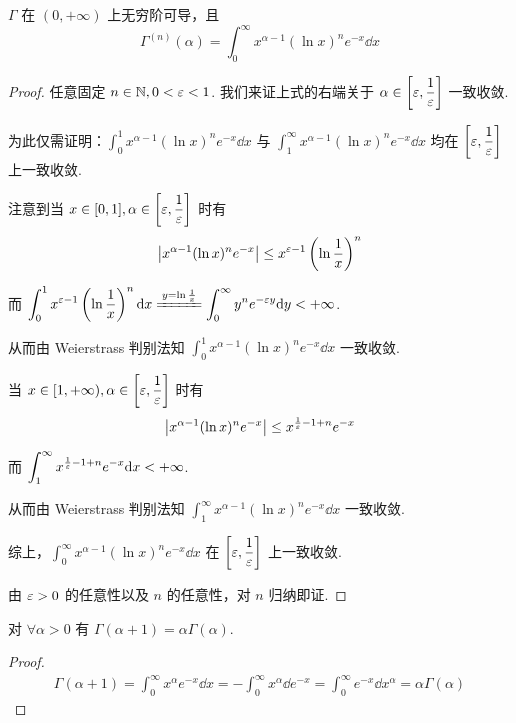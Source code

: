 \begin{property}
    $\Gamma$ 在 $(0,+\infty)$ 上无穷阶可导，且
$$
\Gamma^{(n)}(\alpha)=\int_0^\infty x^{\alpha-1}(\ln x)^ne^{-x}\dd x
$$
\end{property}
\begin{proof}
    任意固定 $n\in\mathbb{N},0<\varepsilon<1$. 我们来证上式的右端关于 $\alpha\in\left[\varepsilon,\dfrac{1}{\varepsilon}\right]$ 一致收敛.

    为此仅需证明：$\displaystyle\int_0^1x^{\alpha-1}(\ln x)^ne^{-x}\dd x$ 与 $\displaystyle\int_1^\infty x^{\alpha-1}(\ln x)^ne^{-x}\dd x$ 均在 $\left[\varepsilon,\dfrac{1}{\varepsilon}\right]$ 上一致收敛.

    注意到当 $x\in[0,1],\alpha\in\left[\varepsilon,\dfrac{1}{\varepsilon}\right]$ 时有
$$
\left\lvert{x^{\alpha-1}(\ln x)^ne^{-x}}\right\rvert\le x^{\varepsilon-1}\left(\ln\frac{1}{x}\right)^n
$$

    而 $\displaystyle\int_0^1x^{\eps-1}\left(\ln\frac{1}{x}\right)^n\dd x\xlongequal{y=\ln\frac{1}{x}}\int_0^\infty y^ne^{-\eps y}\dd y<+\infty$.

    从而由 Weierstrass 判别法知 $\displaystyle\int_0^1x^{\alpha-1}(\ln x)^ne^{-x}\dd x$ 一致收敛.

    当 $x\in[1,+\infty),\alpha\in\left[\varepsilon,\dfrac{1}{\varepsilon}\right]$ 时有
$$
\left\lvert{x^{\alpha-1}(\ln x)^ne^{-x}}\right\rvert\le x^{\frac{1}{\varepsilon}-1+n}e^{-x}
$$

    而 $\displaystyle\int_1^\infty x^{\frac{1}{\varepsilon}-1+n}e^{-x}\mathrm{d} x<+\infty$.

    从而由 Weierstrass 判别法知 $\displaystyle\int_1^\infty x^{\alpha-1}(\ln x)^ne^{-x}\dd x$ 一致收敛.

    综上，$\displaystyle\int_0^\infty x^{\alpha-1}(\ln x)^ne^{-x}\dd x$ 在 $\left[\varepsilon,\dfrac{1}{\varepsilon}\right]$ 上一致收敛.

    由 $\varepsilon>0$ 的任意性以及 $n$ 的任意性，对 $n$ 归纳即证.
\end{proof}


\begin{property}
    对 $\forall\alpha>0$ 有 $\Gamma(\alpha+1)=\alpha\Gamma(\alpha)$.
\end{property}
\begin{proof}
$$
\begin{aligned}
    \Gamma(\alpha+1)=\int_0^\infty x^\alpha e^{-x}\dd x=-\int_0^\infty x^\alpha\dd e^{-x}=\int_0^\infty e^{-x}\dd x^\alpha=\alpha\Gamma(\alpha)
\end{aligned}
$$
\end{proof}

